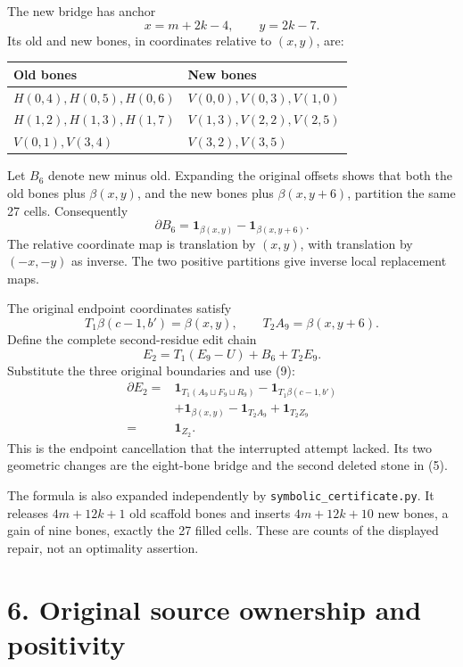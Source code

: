 \documentclass[
  11pt,
]{article}
\begin{document}
The new bridge has anchor \[
 x=m+2k-4,\qquad y=2k-7.
\] Its old and new bones, in coordinates relative to \((x,y)\), are:

\begin{longtable}[]{@{}ll@{}}
\toprule\noalign{}
Old bones & New bones \\
\midrule\noalign{}
\endhead
\bottomrule\noalign{}
\endlastfoot
\(H(0,4),H(0,5),H(0,6)\) & \(V(0,0),V(0,3),V(1,0)\) \\
\(H(1,2),H(1,3),H(1,7)\) & \(V(1,3),V(2,2),V(2,5)\) \\
\(V(0,1),V(3,4)\) & \(V(3,2),V(3,5)\) \\
\end{longtable}

Let \(B_6\) denote new minus old. Expanding the original offsets shows
that both the old bones plus \(\beta(x,y)\), and the new bones plus
\(\beta(x,y+6)\), partition the same 27 cells. Consequently \[
 \partial B_6=\mathbf1_{\beta(x,y)}-
                     \mathbf1_{\beta(x,y+6)}.             \tag{8}
\] The relative coordinate map is translation by \((x,y)\), with
translation by \((-x,-y)\) as inverse. The two positive partitions give
inverse local replacement maps.

The original endpoint coordinates satisfy \[
 T_1\beta(c-1,b')=\beta(x,y),\qquad
 T_2 A_9=\beta(x,y+6).                                    \tag{9}
\] Define the complete second-residue edit chain \[
 E_2=T_1(E_9-U)+B_6+T_2E_9.                               \tag{10}
\] Substitute the three original boundaries and use (9): \[
\begin{split}
\partial E_2
={}&\mathbf1_{T_1(A_9\sqcup F_9\sqcup R_9)}
 -\mathbf1_{T_1\beta(c-1,b')}\\
 &+\mathbf1_{\beta(x,y)}-\mathbf1_{T_2A_9}
 +\mathbf1_{T_2Z_9}\\
={}&\mathbf1_{Z_2}.
\end{split}                                               \tag{11}
\] This is the endpoint cancellation that the interrupted attempt
lacked. Its two geometric changes are the eight-bone bridge and the
second deleted stone in (5).

The formula is also expanded independently by
\texttt{symbolic\_certificate.py}. It releases \(4m+12k+1\) old scaffold
bones and inserts \(4m+12k+10\) new bones, a gain of nine bones, exactly
the 27 filled cells. These are counts of the displayed repair, not an
optimality assertion.

\section{6. Original source ownership and
positivity}\label{original-source-ownership-and-positivity}
\end{document}
